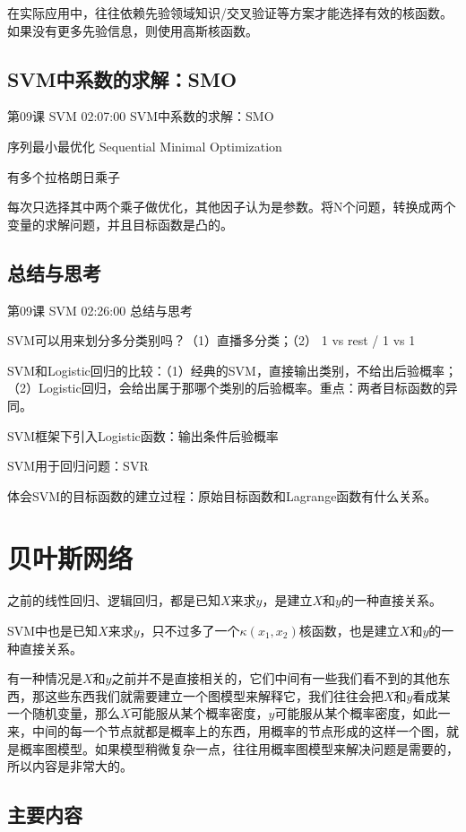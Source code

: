 \documentclass[UTF8]{ctexart}
\begin{document}
在实际应用中，往往依赖先验领域知识/交叉验证等方案才能选择有效的核函数。如果没有更多先验信息，则使用高斯核函数。

\subsection{SVM中系数的求解：SMO}

第09课 SVM 02:07:00 SVM中系数的求解：SMO

序列最小最优化 Sequential Minimal Optimization

有多个拉格朗日乘子

每次只选择其中两个乘子做优化，其他因子认为是参数。将N个问题，转换成两个变量的求解问题，并且目标函数是凸的。

\subsection{总结与思考}

第09课 SVM 02:26:00 总结与思考

SVM可以用来划分多分类别吗？（1）直播多分类；（2） 1 vs rest / 1 vs 1

SVM和Logistic回归的比较：（1）经典的SVM，直接输出类别，不给出后验概率；（2）Logistic回归，会给出属于那哪个类别的后验概率。重点：两者目标函数的异同。

SVM框架下引入Logistic函数：输出条件后验概率

SVM用于回归问题：SVR

体会SVM的目标函数的建立过程：原始目标函数和Lagrange函数有什么关系。

\section{贝叶斯网络}

之前的线性回归、逻辑回归，都是已知$X$来求$y$，是建立$X$和$y$的一种直接关系。

SVM中也是已知$X$来求$y$，只不过多了一个$\kappa(x_{1},x_{2})$核函数，也是建立$X$和$y$的一种直接关系。

有一种情况是$X$和$y$之前并不是直接相关的，它们中间有一些我们看不到的其他东西，那这些东西我们就需要建立一个图模型来解释它，我们往往会把$X$和$y$看成某一个随机变量，那么$X$可能服从某个概率密度，$y$可能服从某个概率密度，如此一来，中间的每一个节点就都是概率上的东西，用概率的节点形成的这样一个图，就是概率图模型。如果模型稍微复杂一点，往往用概率图模型来解决问题是需要的，所以内容是非常大的。

\subsection{主要内容}
\end{document}
